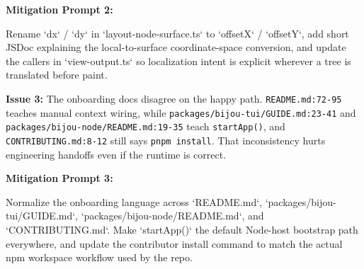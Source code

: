 \textbf{Mitigation Prompt 2:}

\begin{CodeBlock}
Rename `dx` / `dy` in `layout-node-surface.ts` to `offsetX` / `offsetY`, add short JSDoc explaining the local-to-surface coordinate-space conversion, and update the callers in `view-output.ts` so localization intent is explicit wherever a tree is translated before paint.
\end{CodeBlock}

\textbf{Issue 3:} The onboarding docs disagree on the happy path. \texttt{R\allowbreak{}E\allowbreak{}A\allowbreak{}D\allowbreak{}M\allowbreak{}E\allowbreak{}.\allowbreak{}m\allowbreak{}d\allowbreak{}:\allowbreak{}7\allowbreak{}2\allowbreak{}-\allowbreak{}9\allowbreak{}5} teaches manual context wiring, while \texttt{p\allowbreak{}a\allowbreak{}c\allowbreak{}k\allowbreak{}a\allowbreak{}g\allowbreak{}e\allowbreak{}s\allowbreak{}/\allowbreak{}b\allowbreak{}i\allowbreak{}j\allowbreak{}o\allowbreak{}u\allowbreak{}-\allowbreak{}t\allowbreak{}u\allowbreak{}i\allowbreak{}/\allowbreak{}G\allowbreak{}U\allowbreak{}I\allowbreak{}D\allowbreak{}E\allowbreak{}.\allowbreak{}m\allowbreak{}d\allowbreak{}:\allowbreak{}2\allowbreak{}3\allowbreak{}-\allowbreak{}4\allowbreak{}1} and \texttt{p\allowbreak{}a\allowbreak{}c\allowbreak{}k\allowbreak{}a\allowbreak{}g\allowbreak{}e\allowbreak{}s\allowbreak{}/\allowbreak{}b\allowbreak{}i\allowbreak{}j\allowbreak{}o\allowbreak{}u\allowbreak{}-\allowbreak{}n\allowbreak{}o\allowbreak{}d\allowbreak{}e\allowbreak{}/\allowbreak{}R\allowbreak{}E\allowbreak{}A\allowbreak{}D\allowbreak{}M\allowbreak{}E\allowbreak{}.\allowbreak{}m\allowbreak{}d\allowbreak{}:\allowbreak{}1\allowbreak{}9\allowbreak{}-\allowbreak{}3\allowbreak{}5} teach \texttt{s\allowbreak{}t\allowbreak{}a\allowbreak{}r\allowbreak{}t\allowbreak{}A\allowbreak{}p\allowbreak{}p\allowbreak{}(\allowbreak{})}, and \texttt{C\allowbreak{}O\allowbreak{}N\allowbreak{}T\allowbreak{}R\allowbreak{}I\allowbreak{}B\allowbreak{}U\allowbreak{}T\allowbreak{}I\allowbreak{}N\allowbreak{}G\allowbreak{}.\allowbreak{}m\allowbreak{}d\allowbreak{}:\allowbreak{}8\allowbreak{}-\allowbreak{}1\allowbreak{}2} still says \texttt{p\allowbreak{}n\allowbreak{}p\allowbreak{}m\allowbreak{} \allowbreak{}i\allowbreak{}n\allowbreak{}s\allowbreak{}t\allowbreak{}a\allowbreak{}l\allowbreak{}l}. That inconsistency hurts engineering handoffs even if the runtime is correct.

\textbf{Mitigation Prompt 3:}

\begin{CodeBlock}
Normalize the onboarding language across `README.md`, `packages/bijou-tui/GUIDE.md`, `packages/bijou-node/README.md`, and `CONTRIBUTING.md`. Make `startApp()` the default Node-host bootstrap path everywhere, and update the contributor install command to match the actual npm workspace workflow used by the repo.
\end{CodeBlock}

